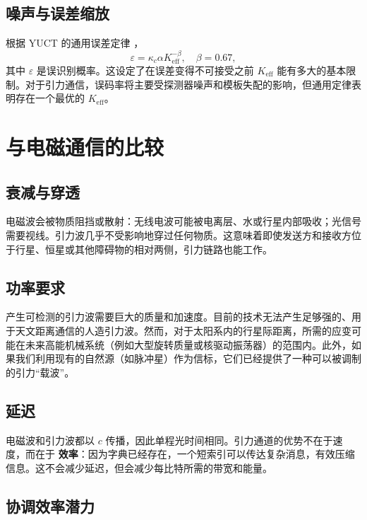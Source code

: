 \documentclass[12pt,a4paper]{article}
\newcommand{\Keff}{K_{\mathrm{eff}}}
\newcommand{\kappac}{\kappa_c}
\newcommand{\eps}{\varepsilon}
\begin{document}
	\subsection{噪声与误差缩放}
	
	根据 YUCT 的通用误差定律 \cite{AppendixL}，
	\begin{equation}
		\eps = \kappac \alpha \Keff^{-\beta}, \quad \beta = 0.67,
		\label{eq:universal-scaling}
	\end{equation}
	其中 \(\eps\) 是误识别概率。这设定了在误差变得不可接受之前 \(\Keff\) 能有多大的基本限制。对于引力通信，误码率将主要受探测器噪声和模板失配的影响，但通用定律表明存在一个最优的 \(\Keff\)。
	
	\section{与电磁通信的比较}
	\label{sec:comparison}
	
	\subsection{衰减与穿透}
	
	电磁波会被物质阻挡或散射：无线电波可能被电离层、水或行星内部吸收；光信号需要视线。引力波几乎不受影响地穿过任何物质。这意味着即使发送方和接收方位于行星、恒星或其他障碍物的相对两侧，引力链路也能工作。
	
	\subsection{功率要求}
	
	产生可检测的引力波需要巨大的质量和加速度。目前的技术无法产生足够强的、用于天文距离通信的人造引力波。然而，对于太阳系内的行星际距离，所需的应变可能在未来高能机械系统（例如大型旋转质量或核驱动振荡器）的范围内。此外，如果我们利用现有的自然源（如脉冲星）作为信标，它们已经提供了一种可以被调制的引力“载波”。
	
	\subsection{延迟}
	
	电磁波和引力波都以 \(c\) 传播，因此单程光时间相同。引力通道的优势不在于速度，而在于 \textbf{效率}：因为字典已经存在，一个短索引可以传达复杂消息，有效压缩信息。这不会减少延迟，但会减少每比特所需的带宽和能量。
	
	\subsection{协调效率潜力}
	
\end{document}
